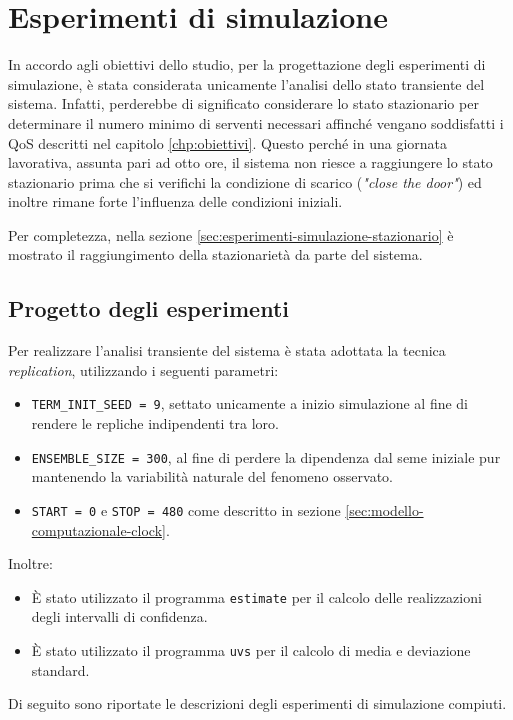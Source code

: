 \chapter{Esperimenti di simulazione}\label{chp:esperimenti-simulazione}
In accordo agli obiettivi dello studio, per la progettazione degli esperimenti di simulazione, è stata considerata unicamente l'analisi dello stato transiente del sistema. Infatti, perderebbe di significato considerare lo stato stazionario per determinare il numero minimo di serventi necessari affinché vengano soddisfatti i QoS descritti nel capitolo \ref{chp:obiettivi}. Questo perché in una giornata lavorativa, assunta pari ad otto ore, il sistema non riesce a raggiungere lo stato stazionario prima che si verifichi la condizione di scarico (\textit{"close the door"}) ed inoltre rimane forte l'influenza delle condizioni iniziali. 

Per completezza, nella sezione \ref{sec:esperimenti-simulazione-stazionario} è mostrato il raggiungimento della stazionarietà da parte del sistema. 

\section{Progetto degli esperimenti}
Per realizzare l'analisi transiente del sistema è stata adottata la tecnica \textit{replication}, utilizzando i seguenti parametri:
\begin{itemize}
\item \texttt{TERM\_INIT\_SEED = 9}, settato unicamente a inizio simulazione al fine di rendere le repliche indipendenti tra loro.
\item \texttt{ENSEMBLE\_SIZE = 300}, al fine di perdere la dipendenza dal seme iniziale pur mantenendo la variabilità naturale del fenomeno osservato.
\item \texttt{START = 0} e \texttt{STOP = 480} come descritto in sezione \ref{sec:modello-computazionale-clock}.
\end{itemize}

Inoltre:
\begin{itemize}
\item È stato utilizzato il programma \texttt{estimate} per il calcolo delle realizzazioni degli intervalli di confidenza.
\item È stato utilizzato il programma \texttt{uvs} per il calcolo di media e deviazione standard.
\end{itemize}

Di seguito sono riportate le descrizioni degli esperimenti di simulazione compiuti.

